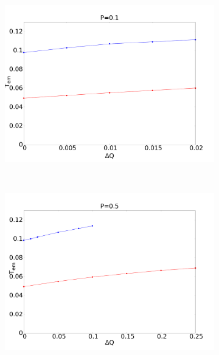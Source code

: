 \documentclass[12pt]{article}
\begin{document}
\begin{figure}[h]
\begin{center}
\begin{subfigure}[t]{0.3\textwidth}
            \includegraphics[scale=0.13]{images/p01_out.pdf}
        \end{subfigure} 
        \
        \begin{subfigure}[t]{0.3\textwidth}
            \includegraphics[scale=0.13]{images/p05_out.pdf}
        \end{subfigure} 
        \
        \begin{subfigure}[t]{0.3\textwidth}

\end{subfigure}
\end{center}
\end{figure}
\end{document}
